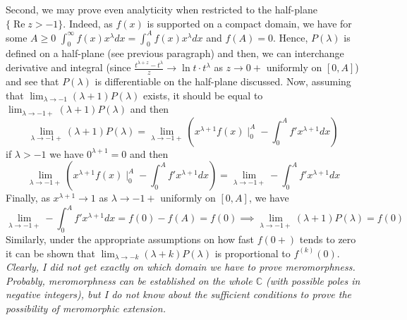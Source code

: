 \documentclass[8pt]{article} %
\renewcommand\Re{\operatorname{Re}}
\let\oldlim\lim
\renewcommand{\lim}{\displaystyle\oldlim}
\begin{document}
Second, we may prove even analyticity when restricted to the half-plane $\{\Re z>-1\}$. Indeed, as $f(x)$ is supported on a compact domain,
we have for some $A\geq 0$ $\int_0^{\infty}f(x)x^{\lambda}dx=\int_0^Af(x)x^{\lambda}dx$ and $f(A)=0$. Hence, $P(\lambda)$ is defined
on a half-plane (see previous paragraph) and then, we can interchange derivative and integral (since $\frac{t^{\lambda+z}-t^{\lambda}}{z}\to\ln t 
\cdot t^{\lambda}$ as $z\to 0+$ uniformly on $[0,A]$) and see that $P(\lambda)$ is differentiable on the half-plane discussed.
Now, assuming that $\lim_{\lambda\to -1}(\lambda+1)P(\lambda)$ exists, it should be equal to $\lim_{\lambda\to -1+}(\lambda+1)P(\lambda)$ and then
\[\lim_{\lambda\to-1+}(\lambda+1)P(\lambda)=\lim_{\lambda\to-1+}\left(x^{\lambda+1}f(x)\mid_0^A-\int_0^A f'x^{\lambda+1}dx\right)\]
if $\lambda>-1$ we have $0^{\lambda+1}=0$ and then
\[\lim_{\lambda\to-1+}\left(x^{\lambda+1}f(x)\mid_0^A-\int_0^A f'x^{\lambda+1}dx\right)=\lim_{\lambda\to-1+}-\int_0^Af'x^{\lambda+1}dx\]
Finally, as $x^{\lambda+1}\to 1$ as $\lambda\to-1+$ uniformly on $[0,A]$, we have  
\[\lim_{\lambda\to-1+}-\int_0^Af'x^{\lambda+1}dx=f(0)-f(A)=f(0)\implies\lim_{\lambda\to-1+}(\lambda+1)P(\lambda)=f(0)\]
Similarly, under the appropriate assumptions on how fast $f(0+)$ tends to zero it can be shown that $\lim_{\lambda\to-k}(\lambda+k)P(\lambda)$
is proportional to $f^{(k)}(0)$.
\textit{Clearly, I did not get exactly on which domain we have to prove meromorphness. Probably, meromorphness can be established
on the whole $\mathbb{C}$ (with possible poles in negative integers), but I do not know about the sufficient conditions to prove the possibility
of meromorphic extension.}
\end{document}
